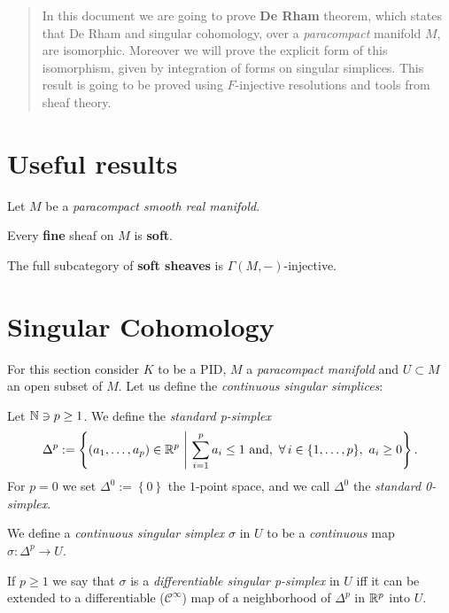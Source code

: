 \begin{abstract}
	In this document we are going to prove \textbf{De Rham} theorem,
	which states that De Rham and singular cohomology,
	over a \textit{paracompact} manifold $M$, are isomorphic.
	Moreover we will prove the explicit form of this isomorphism,
	given by integration of forms on singular simplices.
	This result is going to be proved using $F$-injective resolutions and tools from sheaf theory.
\end{abstract} 

\section{Useful results}
Let $M$ be a \textit{paracompact smooth real manifold}.
\begin{lem}
	Every \textbf{fine} sheaf on $M$ is \textbf{soft}.
\end{lem} 
\begin{lem}\label{lem:gammainjectives}
	The full subcategory of \textbf{soft sheaves} is $\Gamma(M,-)$-injective.
\end{lem} 

\section{Singular Cohomology}
For this section consider $K$ to be a PID, $M$ a \textit{paracompact manifold} and $U \subset M$ an open subset of $M$.
Let us define the \textit{continuous singular simplices}:

\begin{defn}
	Let $\mathbb{N} \ni p \geq 1$. We define the \textit{standard p-simplex}
	\begin{equation}
		\Delta^p := \left\{ \left( a_1, \ldots, a_p \right) \in \R^p \ \middle|\ \sum_{i=1}^{p} a_i \leq 1 \text{ and, } \,\forall\, i \in \{1, \ldots, p \},\ a_i \geq 0  \right\}
	.\end{equation} 
	For $p = 0$ we set $\Delta^0 := \left\{ 0 \right\}$ the $1$-point space, and we call $\Delta^0$ the \textit{standard 0-simplex}.
\end{defn}

\begin{defn}
	We define a \textit{continuous singular simplex} $\sigma$ in $U$ to be a \textit{continuous} map $\sigma: \Delta^p \to U$.

	If $p \geq 1$ we say that $\sigma$ is a \textit{differentiable singular p-simplex} in $U$ iff it can be extended to a differentiable ($\mathscr{C}^\infty$) map of a neighborhood of $\Delta^p$ in $\mathbb{R}^p$ into $U$.
\end{defn}

